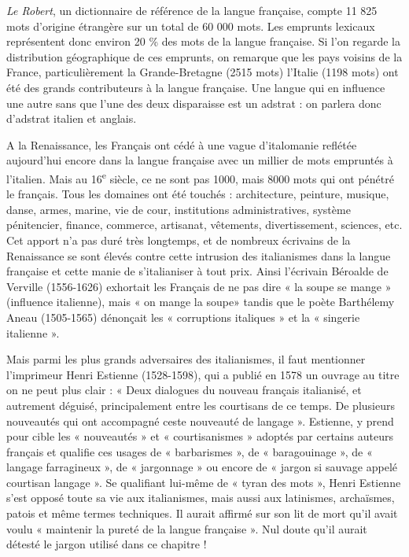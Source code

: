 \textit{Le Robert}, un dictionnaire de référence de la langue française, compte 11 825 mots d’origine étrangère sur un total de 60 000 mots. Les emprunts lexicaux représentent donc environ 20 \% des mots de la langue française. Si l’on regarde la distribution géographique de ces emprunts, on remarque que les pays voisins de la France, particulièrement la Grande-Bretagne (2515 mots) l’Italie (1198 mots) ont été des grands contributeurs à la langue française. Une langue qui en influence une autre sans que l’une des deux disparaisse est un adstrat : on parlera donc d’adstrat italien et anglais.

A la Renaissance, les Français ont cédé à une vague d’italomanie reflétée aujourd’hui encore dans la langue française avec un millier de mots empruntés à l’italien. Mais au 16\textsuperscript{e} siècle, ce ne sont pas 1000, mais 8000 mots qui ont pénétré le français. Tous les domaines ont été touchés : architecture, peinture, musique, danse, armes, marine, vie de cour, institutions administratives, système pénitencier, finance, commerce, artisanat, vêtements, divertissement, sciences, etc. Cet apport n’a pas duré très longtemps, et de nombreux écrivains de la Renaissance se sont élevés contre cette intrusion des italianismes dans la langue française et cette manie de s’italianiser à tout prix. Ainsi l’écrivain Béroalde de Verville (1556-1626) exhortait les Français de ne pas dire « la soupe se mange » (influence italienne), mais « on mange la soupe» tandis que le poète Barthélemy Aneau (1505-1565) dénonçait les « corruptions italiques » et la « singerie italienne ».

Mais parmi les plus grands adversaires des italianismes, il faut mentionner l’imprimeur Henri Estienne (1528-1598), qui a publié en 1578 un ouvrage au titre on ne peut plus clair : « Deux dialogues du nouveau français italianisé, et autrement déguisé, principalement entre les courtisans de ce temps. De plusieurs nouveautés qui ont accompagné ceste nouveauté de langage ». Estienne, y prend pour cible les « nouveautés » et « courtisanismes » adoptés par certains auteurs français et qualifie ces usages de « barbarismes », de « baragouinage », de « langage farragineux », de « jargonnage » ou encore de « jargon si sauvage appelé courtisan langage ». Se qualifiant lui-même de « tyran des mots », Henri Estienne s’est opposé toute sa vie aux italianismes, mais aussi aux latinismes, archaïsmes, patois et même termes techniques. Il aurait affirmé sur son lit de mort qu’il avait voulu « maintenir la pureté de la langue française ». Nul doute qu’il aurait détesté le jargon utilisé dans ce chapitre !

